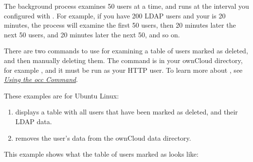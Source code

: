 \documentclass[letterpaper,10pt,english]{sphinxmanual}
\begin{document}
The background process examines 50 users at a time, and runs at the interval you
configured with . For example, if you have 200 LDAP
users and your  is 20 minutes, the process will
examine the first 50 users, then 20 minutes later the next 50 users, and 20
minutes later the next 50, and so on.

There are two  commands to use for examining a table of users marked as
deleted, and then manually deleting them.  The  command is in your
ownCloud directory, for example , and it must be run as
your HTTP user. To learn more about , see
{\hyperref[configuration_server/occ_command::doc]{\emph{\emph{Using the occ Command}}}}.

These examples are for Ubuntu Linux:
\begin{enumerate}
\item {} 
 displays a table with all
users that have been marked as deleted, and their LDAP data.

\item {} 
 removes the user's data from the
ownCloud data directory.

\end{enumerate}

This example shows what the table of users marked as  looks like:
\end{document}

